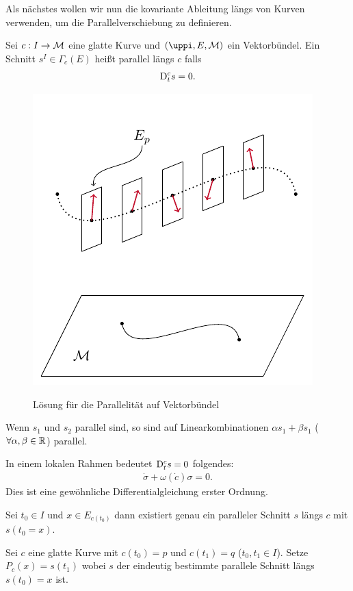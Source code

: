 Als nächstes wollen wir nun die kovariante Ableitung längs von Kurven verwenden, um die Parallelverschiebung zu definieren.
\begin{defs}[Parallelität]
Sei $c: I \to \mathcal{M}$ eine glatte Kurve und $(\pi, E, \mfk)$ ein Vektorbündel.
Ein Schnitt $s^I \in \Gamma_c (E)$ heißt parallel längs $c$ falls 
\begin{align}
\mathrm{D}^c_t s = 0.
\end{align}
\end{defs}
\begin{figure}[H]
\centering
\includegraphics[width=0.7\linewidth]{figures/tikz/parallel_shift_dgl.pdf}
\label{img:parallel_shift:dgl}
\caption{Lösung für die Parallelität auf Vektorbündel}
\end{figure} 
\begin{bem}
Wenn $s_1$ und $s_2$ parallel sind, so sind auf Linearkombinationen $\alpha s_1 + \beta s_1$ ($\forall \alpha, \beta \in \mathbb{R}$) parallel.
\end{bem}
In einem lokalen Rahmen bedeutet $\mathrm{D}^c_t s = 0$ folgendes:
\begin{align}
\dot{\sigma} + \omega(\dot{c}) \sigma = 0.
\end{align}
Dies ist eine gewöhnliche Differentialgleichung erster Ordnung.
\begin{lem}
Sei $t_0 \in I$ und $x \in E_{c(t_0)}$ dann existiert genau ein paralleler Schnitt $s$ längs $c$ mit $s(t_0 = x)$.
\end{lem}
Sei $c$ eine glatte Kurve mit $c(t_0) = p$ und $c(t_1)=q$ ($t_0, t_1 \in I$).
Setze $P_c(x) = s(t_1)$ wobei $s$ der eindeutig bestimmte parallele Schnitt längs $s(t_0) = x$ ist.
